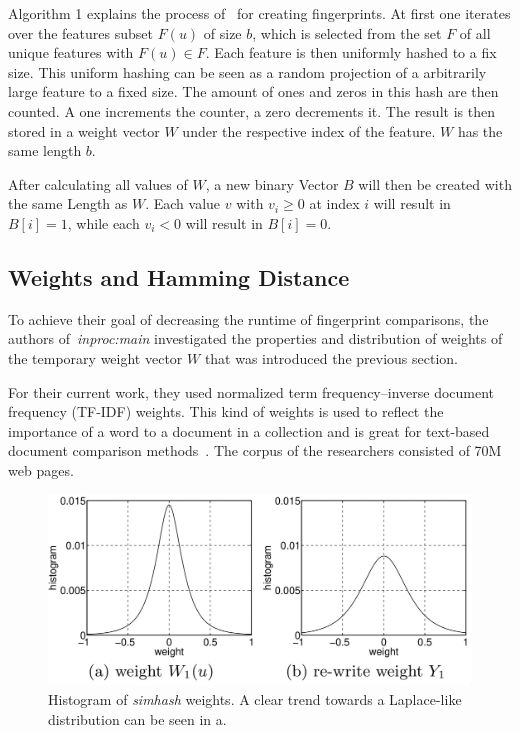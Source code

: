 \documentclass[12pt,a4paper,DIV=calc]{scrartcl}
\begin{document}
Algorithm 1 explains the process of~\cite{inproc:evaluation} for creating fingerprints.
At first one iterates over the features subset $F(u)$ of size $b$, which is selected from the set $F$ of all unique features with $F(u) \in F$.
Each feature is then uniformly hashed to a fix size.
This uniform hashing can be seen as a random projection of a arbitrarily large feature to a fixed size.
The amount of ones and zeros in this hash are then counted.
A one increments the counter, a zero decrements it.
The result is then stored in a weight vector $W$ under the respective index of the feature. $W$ has the same length $b$.

After calculating all values of $W$, a new binary Vector $B$ will then be created with the same Length as $W$.
Each value $v$ with $v_i \geq 0$ at index $i$ will result in $B[i] = 1$, while each $v_i < 0$ will result in $B[i] = 0$.

\subsection{Weights and Hamming Distance}

To achieve their goal of decreasing the runtime of fingerprint comparisons, the authors of~\emph{inproc:main} investigated the properties and distribution of weights of the temporary weight vector $W$ that was introduced the previous section.

For their current work, they used normalized term frequency–inverse document frequency (TF-IDF) weights.
This kind of weights is used to reflect the importance of a word to a document in a collection and is great for text-based document comparison methods~\cite{Salton:1986:IMI:576628}.
The corpus of the researchers consisted of 70M web pages.

\begin{figure}[H]
    \includegraphics[scale=0.4]{./gfx/distribution.png}
    \centering
    \caption{Histogram of \emph{simhash} weights. A clear trend towards a Laplace-like distribution can be seen in a\).}\label{fig:weight-distribution}
\end{figure}
\end{document}
